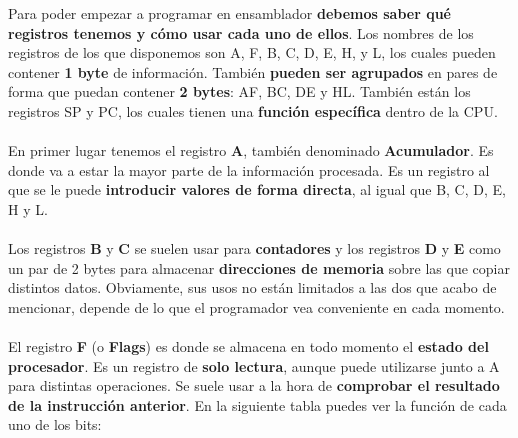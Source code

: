 Para poder empezar a programar en ensamblador \textbf{debemos saber qué registros tenemos y cómo usar cada uno de ellos}. Los nombres de los registros de los que disponemos son A, F, B, C, D, E, H, y L, los cuales pueden contener \textbf{1 byte} de información. También \textbf{pueden ser agrupados} en pares de forma que puedan contener \textbf{2 bytes}: AF, BC, DE y HL. También están los registros SP y PC, los cuales tienen una \textbf{función específica} dentro de la CPU.
\\ \\
En primer lugar tenemos el registro \textbf{A}, también denominado \textbf{Acumulador}. Es donde va a estar la mayor parte de la información procesada. Es un registro al que se le puede \textbf{introducir valores de forma directa}, al igual que B, C, D, E, H y L.
\\ \\
Los registros \textbf{B} y \textbf{C} se suelen usar para \textbf{contadores} y los registros \textbf{D} y \textbf{E} como un par de 2 bytes para almacenar \textbf{direcciones de memoria} sobre las que copiar distintos datos. Obviamente, sus usos no están limitados a las dos que acabo de mencionar, depende de lo que el programador vea conveniente en cada momento.
\\ \\
El registro \textbf{F} (o \textbf{Flags}) es donde se almacena en todo momento el \textbf{estado del procesador}. Es un registro de \textbf{solo lectura}, aunque puede utilizarse junto a A para distintas operaciones. Se suele usar a la hora de \textbf{comprobar el resultado de la instrucción anterior}. En la siguiente tabla puedes ver la función de cada uno de los bits:

